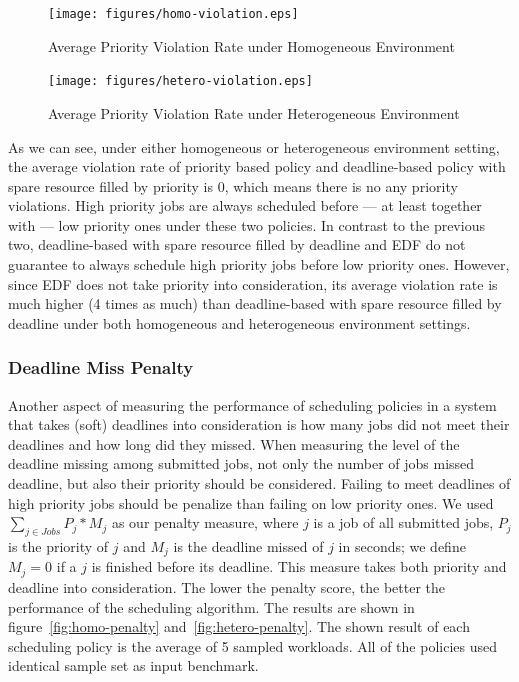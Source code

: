 \begin{figure}[htbp]
  \centering
  \texttt{[image: figures/homo-violation.eps]}
  \caption{Average Priority Violation Rate under Homogeneous Environment}
  \label{fig:homo-violation}
\end{figure}

\begin{figure}[htbp]
  \centering
  \texttt{[image: figures/hetero-violation.eps]}
  \caption{Average Priority Violation Rate under Heterogeneous Environment}
  \label{fig:hetero-violation}
\end{figure}

As we can see, under either homogeneous or heterogeneous environment
setting, the average violation rate of priority based policy and
deadline-based policy with spare resource filled by priority is 0, which
means there is no any priority violations.
High priority jobs are always scheduled before --- at least together
with --- low priority ones under these two policies.
In contrast to the previous two, deadline-based with spare resource
filled by deadline and EDF do not guarantee to always schedule high
priority jobs before low priority ones.
However, since EDF does not take priority into consideration, its
average violation rate is much higher (4 times as much) than
deadline-based with spare resource filled by deadline under both
homogeneous and heterogeneous environment settings.

\subsubsection{Deadline Miss Penalty}

Another aspect of measuring the performance of scheduling policies in a
system that takes (soft) deadlines into consideration is how many jobs
did not meet their deadlines and how long did they missed.
When measuring the level of the deadline missing among submitted jobs,
not only the number of jobs missed deadline, but also their priority
should be considered.
Failing to meet deadlines of high priority jobs should be penalize than
failing on low priority ones.
We used $\sum_{j \in Jobs} P_j * M_j$ as our penalty measure, where $j$
is a job of all submitted jobs, $P_j$ is the priority of $j$ and $M_j$
is the deadline missed of $j$ in seconds; we define $M_j = 0$ if a $j$
is finished before its deadline.
This measure takes both priority and deadline into consideration.
The lower the penalty score, the better the performance of the
scheduling algorithm.
The results are shown in figure~\ref{fig:homo-penalty}
and~\ref{fig:hetero-penalty}.
The shown result of each scheduling policy is the average of 5 sampled
workloads.
All of the policies used identical sample set as input benchmark.

